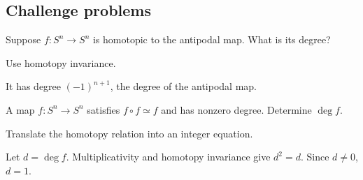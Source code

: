 \subsection*{Challenge problems}

\begin{exercise}\label{exr:viii03-ped-15}
Suppose $f:S^n\to S^n$ is homotopic to the antipodal map.  What is its degree?
\end{exercise}
\begin{hint}
Use homotopy invariance.
\end{hint}
\begin{solution}
It has degree $(-1)^{n+1}$, the degree of the antipodal map.
\end{solution}

\begin{exercise}\label{exr:viii03-ped-16}
A map $f:S^n\to S^n$ satisfies $f\circ f\simeq f$ and has nonzero degree. Determine $\deg f$.
\end{exercise}
\begin{hint}
Translate the homotopy relation into an integer equation.
\end{hint}
\begin{solution}
Let $d=\deg f$.  Multiplicativity and homotopy invariance give $d^2=d$.  Since $d\ne0$, $d=1$.
\end{solution}

